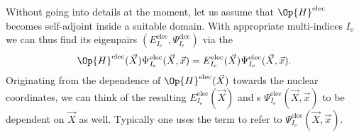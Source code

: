 \newcommand{\Iel}{I_\text{e}}
\newcommand{\Inu}{I_\text{n}}
Without going into details at the moment,
let us assume that $\Op{H}^\text{elec}$ becomes self-adjoint
inside a suitable domain.
With appropriate multi-indices $\Iel$
we can thus find its eigenpairs $(E^\text{elec}_{\Iel}, \Psi^\text{elec}_{\Iel})$
via the 
\begin{equation}
	\Op{H}^\text{elec}(\vec{X}) \Psi^\text{elec}_{\Iel}(\vec{X}, \vec{x})
	= E^\text{elec}_{\Iel}(\vec{X})
		\Psi^\text{elec}_{\Iel}(\vec{X}, \vec{x}).
	\label{eqn:ElectronicSchrödinger}
\end{equation}
Originating from the dependence of $\Op{H}^\text{elec}(\vec{X})$
towards the nuclear coordinates,
we can think of the resulting 
$E^\text{elec}_{\Iel}(\vec{X})$
and s $\Psi^\text{elec}_{\Iel}(\vec{X}, \vec{x})$
to be dependent on $\vec{X}$ as well.
Typically one uses the term 
to refer to $\Psi^\text{elec}_{\Iel}(\vec{X}, \vec{x})$.

